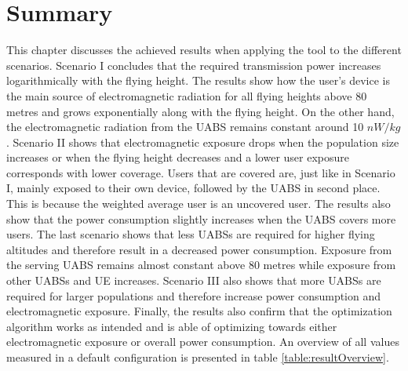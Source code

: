 \section{Summary}
This chapter discusses the achieved results when applying the tool to the different scenarios.
Scenario I concludes that the required transmission power increases logarithmically with the flying height.
The results show how the user's device is the main source of electromagnetic radiation 
for all flying heights above 80 metres and grows exponentially along with the flying height. 
On the other hand, the electromagnetic 
radiation from the \gls{UABS} remains constant around 10 $nW/kg$.
Scenario II shows that electromagnetic exposure  drops when the population size increases or when the flying height decreases
and a lower user exposure corresponds with lower coverage. Users that are covered are, just like in Scenario I, 
mainly exposed to their own device, followed by the \gls{UABS} in second place. This is because the weighted average user is 
an uncovered user. The results also show that 
the power consumption slightly increases when the \gls{UABS} covers more users.
The last scenario shows that less \gls{UABS}s are required for higher flying altitudes and therefore 
result in a decreased power consumption.  Exposure from the serving \gls{UABS} remains almost constant above 80 metres while 
exposure from other \gls{UABS}s and \gls{UE} increases. Scenario III also shows that more \gls{UABS}s are 
required for larger populations and therefore increase power consumption and electromagnetic exposure.
Finally, the results also confirm that the optimization algorithm works as intended 
and is able of optimizing towards either electromagnetic exposure or overall power consumption.
An overview of all values measured in a default configuration is presented in table \ref{table:resultOverview}.

